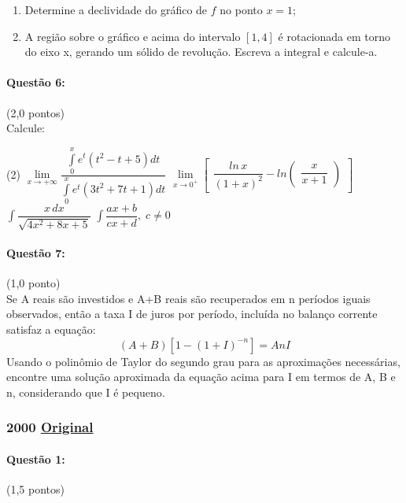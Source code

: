 \documentclass[12pt,a4paper]{article}
\newcommand{\original}[1]{\tiny \href{#1}{Original} \normalsize}
\begin{document}
\begin{enumerate}[label=(\alph*)]
\item Determine a declividade do gráfico de $f$ no ponto $x=1$;
\item A região sobre o gráfico e acima do intervalo $[1,4]$ é rotacionada em torno do eixo x, gerando um sólido de revolução. Escreva a integral e calcule-a.
\end{enumerate}


\paragraph{Questão 6:}(2,0 pontos)\\
Calcule:

\begin{tasks}(2)
\task $\underset{x \to +\infty }{\displaystyle\lim}\dfrac{\displaystyle\int\limits_{0}^{x}e^t(t^2-t+5)dt}{\displaystyle\int\limits_{0}^{x}e^t(3t^2+7t+1)dt}$
\task $\underset{x \to 0^{+} }{\displaystyle\lim}\begin{bmatrix}
\dfrac{ln\,x}{(1+x)^2}-ln\begin{pmatrix}
\dfrac{x}{x+1}
\end{pmatrix}
\end{bmatrix}$
\task $\displaystyle\int\dfrac{x\,dx}{\sqrt{4x^2+8x+5}}$
\task $\displaystyle\int\dfrac{ax+b}{cx+d},\; c\neq 0$
\end{tasks}


\paragraph{Questão 7:}(1,0 ponto)\\
Se A reais são investidos e A+B reais são recuperados em n períodos iguais
observados, então a taxa I de juros por período, incluída no balanço corrente satisfaz a equação:
$$(A+B)[1-(1+I)^{-n}]=AnI$$
Usando o polinômio de Taylor do segundo grau para as aproximações necessárias, encontre
uma solução aproximada da equação acima para I em termos de A, B e n, considerando que I é pequeno.

\newpage

\subsubsection{2000 \original{https://drive.google.com/open?id=1Slz2QBfIxnZuLY1xZT6YeNYisANdpUUG}}


\paragraph{Questão 1:}(1,5 pontos)
\end{document}
